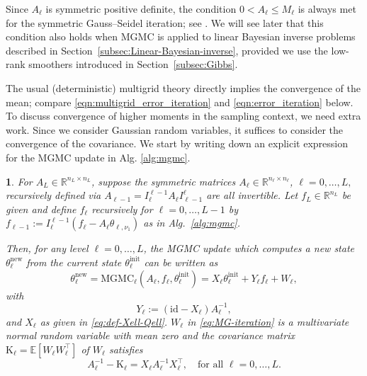\documentclass[11pt,english]{article}
\theoremstyle{plain}
\theoremstyle{plain}
\theoremstyle{plain}
\newtheorem{lem}[thm]{\protect\lemmaname}
\theoremstyle{plain}
\numberwithin{equation}{section}
\newcommand*{\WCov}{\mathrm{K}}
\newcommand{\jg}[1]{#1}
\providecommand{\lemmaname}{Lemma}
\begin{document}
Since $A_{\ell}$ is symmetric positive definite, the condition $0<A_{\ell}\leq M_{\ell}$ is always met for the symmetric Gauss--Seidel iteration; see \cite[Section 6.2.4.3]{Hackbusch.W_1985_MultiGridMethodsApplications}. We will see later that  this condition also holds when MGMC is applied to linear Bayesian inverse problems described in Section~\ref{subsec:Linear-Bayesian-inverse}, provided we use the low-rank smoothers introduced in Section~\ref{subsec:Gibbs}.

\jg{The usual (deterministic) multigrid theory directly implies the convergence of the mean; compare \eqref{eqn:multigrid_error_iteration} and \eqref{eqn:error_iteration} below.}  
To discuss convergence of higher moments in the sampling context, we need extra work. Since we consider Gaussian random variables, it suffices to consider the convergence of the covariance. We start by writing down an explicit expression for the MGMC update in Alg. \ref{alg:mgmc}.
\begin{lem}
	\label{lem:MG-iteration-rep}
	For $A_{L}\in\mathbb{R}^{n_{L}\times n_{L}}$, suppose the symmetric matrices $A_{\ell}\in\mathbb{R}^{n_{\ell}\times n_{\ell}}$,
	$\ell=0,\dots,L,$ recursively defined via $A_{\ell-1}=I_{\ell}^{\ell-1}A_{\ell}I_{\ell-1}^{\ell}$ are all invertible. Let $f_{L}\in\mathbb{R}^{n_{L}}$ be given and define $f_{\ell}$ recursively for $\ell=0,\dots,L-1$ by $f_{\ell-1}:=I_{\ell}^{\ell-1}(f_{\ell}-A_{\ell}\theta_{\ell,\nu_{1}})$ as in Alg.~\ref{alg:mgmc}.

	Then, for any level $\ell=0,\dots,L$, the MGMC update which computes a new state $\theta_{\ell}^{\mathrm{new}}$ from the current state $\theta_{\ell}^{\mathrm{init}}$ can be written as
	\begin{equation}
		\theta_{\ell}^{\mathrm{new}}=\mathrm{MGMC}_{\ell}(A_{\ell},f_{\ell},\theta_{\ell}^{\mathrm{init}}) = X_{\ell}\theta_{\ell}^{\mathrm{init}}+Y_{\ell}f_{\ell}+W_\ell,\label{eq:MG-iteration}
	\end{equation}
	with
	\begin{equation}
		Y_{\ell}:=(\mathrm{id}-X_{\ell})A_{\ell}^{-1}\label{eq:def-Y-ell},
	\end{equation}
and $X_{\ell}$ as given in \eqref{eq:def-Xell-Qell}. $W_\ell$ in \eqref{eq:MG-iteration} is a multivariate normal random variable with mean zero and the covariance matrix $\WCov_{\ell}=\mathbb{E}[W_{\ell}W_{\ell}^\top]$ of $W_\ell$ satisfies
	\begin{equation}
		A_{\ell}^{-1}-\WCov_{\ell}=X_{\ell}A_{\ell}^{-1}X_{\ell}^{\top},\quad\text{for all $\ell=0,\dots,L$}.\label{eq:noise-cov-id}
	\end{equation}
\end{lem}
\end{document}
